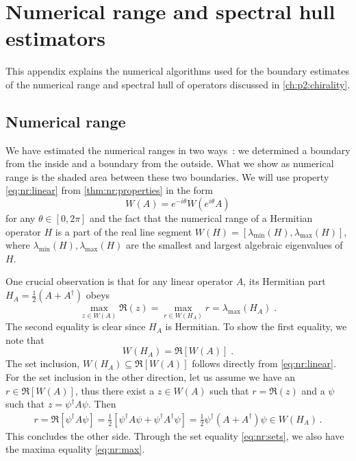 \chapter{Numerical range and spectral hull estimators}
\label{ch:appendix:C}
\label{ch:appendix:nr:ch:estimator}


This appendix explains the numerical algorithms used for the boundary estimates of the numerical range and spectral hull of operators discussed in \cref{ch:p2:chirality}.

\section{Numerical range}
\label{app:C:numerical:range}

We have estimated the numerical ranges in two ways~\cite{johnson1978numerical}: we determined a boundary from the inside and a boundary from the outside.
What we show as numerical range is the shaded area between these two boundaries.
We will use property \cref{eq:nr:linear} from \cref{thm:nr:properties} in the form
\begin{equation} \label{eq:nr:linear:theta}
W(A) = e^{-i \theta} W(e^{i \theta} A)
\end{equation}
for any $\theta \in [0, 2 \pi]$ and the fact that the numerical range of a Hermitian operator $H$ is a part of the real line segment $W(H) = [\lambda_{\text{min}}(H), \lambda_{\text{max}}(H)]$, where $\lambda_{\text{min}}(H), \lambda_{\text{max}}(H)$ are the smallest and largest algebraic eigenvalues of $H$.

One crucial observation is that for any linear operator $A$, its Hermitian part $H_A = \frac{1}{2} ( A + A^{\dagger} )$ obeys
\begin{equation} \label{eq:nr:max}
\max_{z \in W(A)} \Re(z) = \max_{r \in W(H_A)} r = \lambda_{\text{max}}(H_A)\;.
\end{equation}
The second equality is clear since $H_A$ is Hermitian.
To show the first equality, we note that
\begin{equation} \label{eq:nr:sets}
W(H_A) = \Re[W(A)] \;.
\end{equation}
The set inclusion, $W(H_A) \subseteq \Re[W(A)]$ follows directly from \cref{eq:nr:linear}.
For the set inclusion in the other direction, let us assume we have an $r \in \Re[W(A)]$, thus there exist a $z \in W(A)$ such that $r = \Re(z)$ and a $\psi$ such that $z = \psi^{\dagger} A \psi$.
Then
\begin{align}
r
= \Re [\psi^{\dagger} A \psi]
= \frac{1}{2} \left[ \psi^{\dagger} A \psi + \psi^{\dagger} A^{\dagger} \psi \right]
= \frac{1}{2} \psi^{\dagger} (A+A^{\dagger}) \psi
\in W(H_A) \,.
\end{align}
This concludes the other side.
Through the set equality \cref{eq:nr:sets}, we also have the maxima equality \cref{eq:nr:max}.

